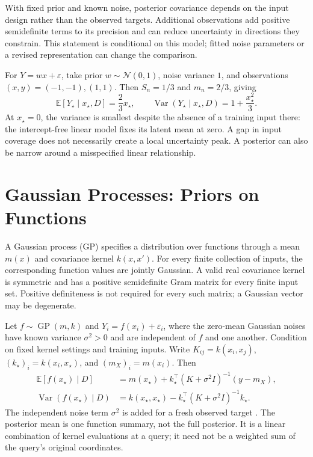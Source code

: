 With fixed prior and known noise, posterior covariance depends on the input design rather than the observed targets. Additional observations add positive semidefinite terms to its precision and can reduce uncertainty in directions they constrain. This statement is conditional on this model; fitted noise parameters or a revised representation can change the comparison.

For $Y=wx+\varepsilon$, take prior $w\sim\mathcal N(0,1)$, noise variance $1$, and observations $(x,y)=(-1,-1),(1,1)$. Then $S_n=1/3$ and $m_n=2/3$, giving
\[
\mathbb E[Y_\star\mid x_\star,D]=\frac23x_\star,
\qquad\operatorname{Var}(Y_\star\mid x_\star,D)
=1+\frac{x_\star^2}{3}.
\]
At $x_\star=0$, the variance is smallest despite the absence of a training input there: the intercept-free linear model fixes its latent mean at zero. A gap in input coverage does not necessarily create a local uncertainty peak. A posterior can also be narrow around a misspecified linear relationship.

\section{Gaussian Processes: Priors on Functions}
\label{sec:gaussian-processes}

A Gaussian process (GP) specifies a distribution over functions through a mean $m(x)$ and covariance kernel $k(x,x')$. For every finite collection of inputs, the corresponding function values are jointly Gaussian. A valid real covariance kernel is symmetric and has a positive semidefinite Gram matrix for every finite input set. Positive definiteness is not required for every such matrix; a Gaussian vector may be degenerate.

Let $f\sim\operatorname{GP}(m,k)$ and $Y_i=f(x_i)+\varepsilon_i$, where the zero-mean Gaussian noises have known variance $\sigma^2>0$ and are independent of $f$ and one another. Condition on fixed kernel settings and training inputs. Write $K_{ij}=k(x_i,x_j)$, $(k_\star)_i=k(x_i,x_\star)$, and $(m_X)_i=m(x_i)$. Then
\begin{align*}
\mathbb E[f(x_\star)\mid D]
&=m(x_\star)+k_\star^\top(K+\sigma^2I)^{-1}(y-m_X),\\
\operatorname{Var}(f(x_\star)\mid D)
&=k(x_\star,x_\star)
-k_\star^\top(K+\sigma^2I)^{-1}k_\star.
\end{align*}
The independent noise term $\sigma^2$ is added for a fresh observed target \citep{rasmussen2006gp}. The posterior mean is one function summary, not the full posterior. It is a linear combination of kernel evaluations at a query; it need not be a weighted sum of the query's original coordinates.

